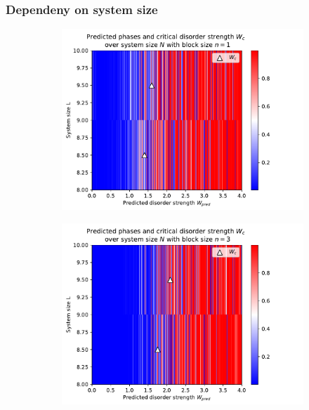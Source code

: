 \documentclass[reprint,amsmath,amssymb,aps,prb]{revtex4-2}
\begin{document}
\subsubsection{Dependeny on system size}

\lipsum[1]%


\onecolumngrid
\begin{center}
	\begin{figure}[H]
		\centering	
		\begin{subfigure}[c]{0.45\textwidth}
			\includegraphics[width=\textwidth]{../results/Wc/n1_Wc_N_dependency.pdf}
		\end{subfigure}
		\begin{subfigure}[c]{0.45\textwidth}
			\includegraphics[width=\textwidth]{../results/Wc/n3_Wc_N_dependency.pdf}

\end{subfigure}
\end{figure}
\end{center}
\end{document}

